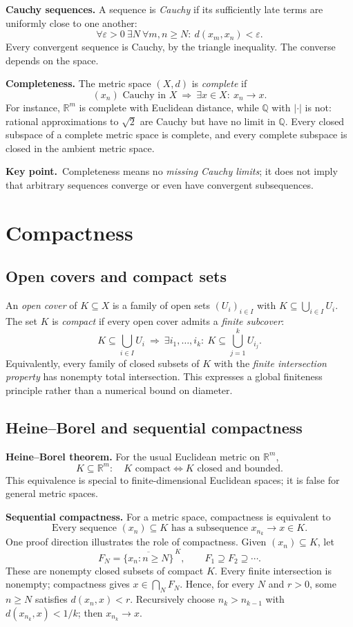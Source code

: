 \documentclass[10pt,a4paper]{article}
\newcommand{\R}{\mathbb R}
\newcommand{\Q}{\mathbb Q}
\newcommand{\eps}{\varepsilon}
\newcommand{\key}[1]{\par\smallskip\textcolor{accent}{\textbf{Key point.}}\ #1\par}
\begin{document}
\textbf{Cauchy sequences.} A sequence is \emph{Cauchy} if its sufficiently late terms are uniformly close to one another:
\[
\boxed{\forall\eps>0\ \exists N\ \forall m,n\ge N:\ d(x_m,x_n)<\eps.}
\]
Every convergent sequence is Cauchy, by the triangle inequality. The converse depends on the space.

\textbf{Completeness.} The metric space $(X,d)$ is \emph{complete} if
\[
\boxed{(x_n)\text{ Cauchy in }X\ \Longrightarrow\ \exists x\in X:\ x_n\to x.}
\]
For instance, $\R^m$ is complete with Euclidean distance, while $\Q$ with $|\cdot|$ is not: rational approximations to $\sqrt2$ are Cauchy but have no limit in $\Q$. Every closed subspace of a complete metric space is complete, and every complete subspace is closed in the ambient metric space.

\key{Completeness means no \emph{missing Cauchy limits}; it does not imply that arbitrary sequences converge or even have convergent subsequences.}

\section{Compactness}
\subsection{Open covers and compact sets}
An \emph{open cover} of $K\subseteq X$ is a family of open sets $(U_i)_{i\in I}$ with $K\subseteq\bigcup_{i\in I}U_i$. The set $K$ is \emph{compact} if every open cover admits a \emph{finite subcover}:
\[
\boxed{K\subseteq\bigcup_{i\in I}U_i\ \Longrightarrow\
\exists i_1,\ldots,i_k:\ K\subseteq\bigcup_{j=1}^kU_{i_j}.}
\]
Equivalently, every family of closed subsets of $K$ with the \emph{finite intersection property} has nonempty total intersection. This expresses a global finiteness principle rather than a numerical bound on diameter.

\subsection{Heine--Borel and sequential compactness}
\textbf{Heine--Borel theorem.} For the usual Euclidean metric on $\R^m$,
\[
\boxed{K\subseteq\R^m:\quad K\text{ compact}\iff K\text{ closed and bounded}.}
\]
This equivalence is special to finite-dimensional Euclidean spaces; it is false for general metric spaces.

\textbf{Sequential compactness.} For a metric space, compactness is equivalent to
\[
\boxed{\text{Every sequence }(x_n)\subseteq K\text{ has a subsequence }x_{n_k}\to x\in K.}
\]
One proof direction illustrates the role of compactness. Given $(x_n)\subseteq K$, let
\[
F_N=\overline{\{x_n:n\ge N\}}^{\,K},\qquad F_1\supseteq F_2\supseteq\cdots.
\]
These are nonempty closed subsets of compact $K$. Every finite intersection is nonempty; compactness gives $x\in\bigcap_NF_N$. Hence, for every $N$ and $r>0$, some $n\ge N$ satisfies $d(x_n,x)<r$. Recursively choose $n_k>n_{k-1}$ with $d(x_{n_k},x)<1/k$; then $x_{n_k}\to x$.
\end{document}
